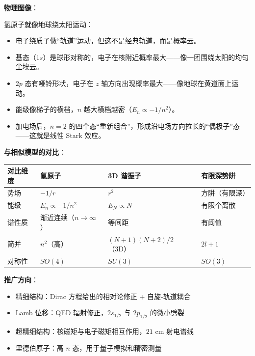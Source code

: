 \begin{insightbox}[物理图像与模型关联]
\textbf{物理图像}：

氢原子就像地球绕太阳运动：
\begin{itemize}[nosep]
    \item 电子绕质子做``轨道''运动，但这不是经典轨道，而是概率云。
    \item 基态（$1s$）是球形对称的，电子在核附近概率最大——像一团围绕太阳的均匀尘埃云。
    \item $2p$ 态有哑铃形状，电子在 $z$ 轴方向出现概率最大——像地球在黄道面上运动。
    \item 能级像梯子的横档，$n$ 越大横档越密（$E_n\propto-1/n^2$）。
    \item 加电场后，$n=2$ 的四个态``重新组合''，形成沿电场方向拉长的``偶极子''态——这就是线性 Stark 效应。
\end{itemize}

\textbf{与相似模型的对比}：
\begin{center}
\begin{tabular}{llll}
\toprule
\textbf{对比维度} & \textbf{氢原子} & \textbf{3D 谐振子} & \textbf{有限深势阱} \\
\midrule
势场 & $-1/r$ & $r^2$ & 方阱（有限深） \\
能级 & $E_n\propto-1/n^2$ & $E_N\propto N$ & 有限个离散 \\
谱性质 & 渐近连续（$n\to\infty$） & 等间距 & 有阈值 \\
简并 & $n^2$（高） & $(N+1)(N+2)/2$（3D） & $2l+1$ \\
对称性 & $SO(4)$ & $SU(3)$ & $SO(3)$ \\
\bottomrule
\end{tabular}
\end{center}

\textbf{推广方向}：
\begin{itemize}[nosep]
    \item 精细结构：Dirac 方程给出的相对论修正 + 自旋-轨道耦合
    \item Lamb 位移：QED 辐射修正，$2s_{1/2}$ 与 $2p_{1/2}$ 的微小劈裂
    \item 超精细结构：核磁矩与电子磁矩相互作用，$21$ cm 射电谱线
    \item 里德伯原子：高 $n$ 态，用于量子模拟和精密测量
\end{itemize}
\end{insightbox}

